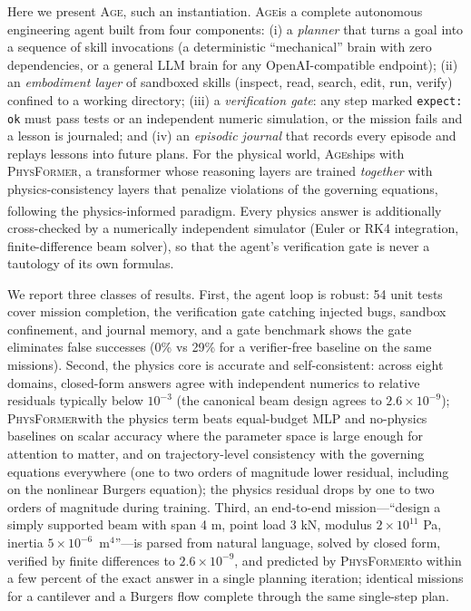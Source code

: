 \documentclass[11pt,a4paper]{article}
\newcommand{\Age}{\textsc{Age}}
\newcommand{\PhysFormer}{\textsc{PhysFormer}}
\newcommand{\pn}{\textsuperscript}
\begin{document}
Here we present \Age, such an instantiation. \Age is a complete autonomous
engineering agent built from four components: (i) a \emph{planner} that
turns a goal into a sequence of skill invocations (a deterministic
``mechanical'' brain with zero dependencies, or a general LLM brain for any
OpenAI-compatible endpoint); (ii) an \emph{embodiment layer} of sandboxed
skills (inspect, read, search, edit, run, verify) confined to a working
directory; (iii) a \emph{verification gate}: any step marked
\texttt{expect: ok} must pass tests or an independent numeric simulation, or
the mission fails and a lesson is journaled; and (iv) an \emph{episodic
journal} that records every episode and replays lessons into future plans.
For the physical world, \Age ships with \PhysFormer, a transformer whose
reasoning layers are trained \emph{together} with physics-consistency layers
that penalize violations of the governing equations, following the
physics-informed paradigm\pn{\citep{raissi2019}}. Every physics answer is
additionally cross-checked by a numerically independent simulator (Euler or
RK4 integration, finite-difference beam solver), so that the agent's
verification gate is never a tautology of its own formulas.

We report three classes of results. First, the agent loop is robust: 54 unit
tests cover mission completion, the verification gate catching injected
bugs, sandbox confinement, and journal memory, and a gate benchmark shows
the gate eliminates false successes (0\% vs 29\% for a verifier-free
baseline on the same missions). Second, the physics core is accurate and
self-consistent: across eight domains, closed-form answers agree with
independent numerics to relative residuals typically below $10^{-3}$
(the canonical beam design agrees to $2.6\times10^{-9}$); \PhysFormer with
the physics term beats equal-budget MLP and no-physics baselines on scalar
accuracy where the parameter space is large enough for attention to matter,
and on trajectory-level consistency with the governing equations everywhere
(one to two orders of magnitude lower residual, including on the nonlinear
Burgers equation); the physics residual drops by one to two orders of
magnitude during training. Third, an end-to-end mission---``design a simply
supported beam with span 4 m, point load 3 kN, modulus $2\times10^{11}$ Pa,
inertia $5\times10^{-6}$~m$^4$''---is parsed from natural language, solved
by closed form, verified by finite differences to $2.6\times10^{-9}$, and
predicted by \PhysFormer to within a few percent of the exact answer in a
single planning iteration; identical missions for a cantilever and a
Burgers flow complete through the same single-step plan.
\end{document}

